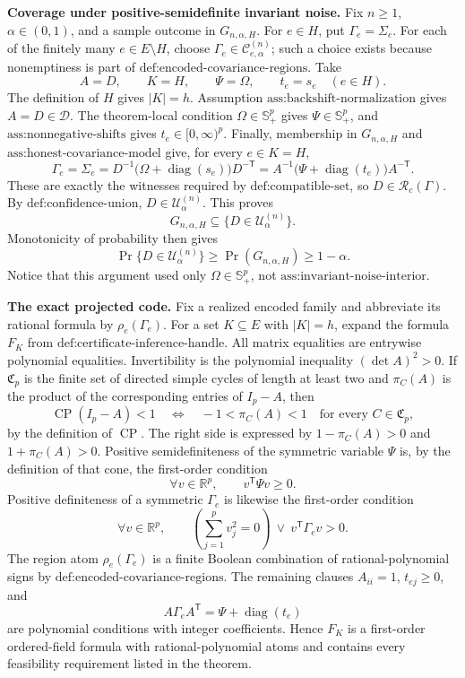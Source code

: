 \textbf{Coverage under positive-semidefinite invariant noise.}
Fix \(n\geq1\), \(\alpha\in(0,1)\), and a sample outcome in \(G_{n,\alpha,H}\). For \(e\in H\), put \(\Gamma_e=\Sigma_e\). For each of the finitely many \(e\in E\setminus H\), choose \(\Gamma_e\in\mathcal C^{(n)}_{e,\alpha}\); such a choice exists because nonemptiness is part of \(\text{def:encoded-covariance-regions}\). Take
\[
A=D,\qquad K=H,\qquad \Psi=\Omega,\qquad t_e=s_e\quad(e\in H).
\]
The definition of \(H\) gives \(|K|=h\). Assumption \(\text{ass:backshift-normalization}\) gives \(A=D\in\mathcal D\). The theorem-local condition \(\Omega\in\mathbb S_+^p\) gives \(\Psi\in\mathbb S_+^p\), and \(\text{ass:nonnegative-shifts}\) gives \(t_e\in[0,\infty)^p\). Finally, membership in \(G_{n,\alpha,H}\) and \(\text{ass:honest-covariance-model}\) give, for every \(e\in K=H\),
\[
\Gamma_e=\Sigma_e
=D^{-1}\bigl(\Omega+\operatorname{diag}(s_e)\bigr)D^{-\mathsf T}
=A^{-1}\bigl(\Psi+\operatorname{diag}(t_e)\bigr)A^{-\mathsf T}.
\]
These are exactly the witnesses required by \(\text{def:compatible-set}\), so \(D\in\mathcal R_c(\Gamma)\). By \(\text{def:confidence-union}\), \(D\in\mathcal U^{(n)}_\alpha\). This proves
\[
G_{n,\alpha,H}\subseteq\{D\in\mathcal U^{(n)}_\alpha\}.
\]
Monotonicity of probability then gives
\[
\Pr\{D\in\mathcal U^{(n)}_\alpha\}
\geq\Pr(G_{n,\alpha,H})\geq1-\alpha.
\]
Notice that this argument used only \(\Omega\in\mathbb S_+^p\), not \(\text{ass:invariant-noise-interior}\).

\textbf{The exact projected code.}
Fix a realized encoded family and abbreviate its rational formula by \(\rho_e(\Gamma_e)\). For a set \(K\subseteq E\) with \(|K|=h\), expand the formula \(F_K\) from \(\text{def:certificate-inference-handle}\). All matrix equalities are entrywise polynomial equalities. Invertibility is the polynomial inequality \((\det A)^2>0\). If \(\mathfrak C_p\) is the finite set of directed simple cycles of length at least two and \(\pi_C(A)\) is the product of the corresponding entries of \(I_p-A\), then
\[
\operatorname{CP}(I_p-A)<1
\quad\Longleftrightarrow\quad
-1<\pi_C(A)<1\quad\text{for every }C\in\mathfrak C_p,
\]
by the definition of \(\operatorname{CP}\). The right side is expressed by \(1-\pi_C(A)>0\) and \(1+\pi_C(A)>0\). Positive semidefiniteness of the symmetric variable \(\Psi\) is, by the definition of that cone, the first-order condition
\[
\forall v\in\mathbb R^p,\qquad v^{\mathsf T}\Psi v\geq0.
\]
Positive definiteness of a symmetric \(\Gamma_e\) is likewise the first-order condition
\[
\forall v\in\mathbb R^p,\qquad
\left(\sum_{j=1}^p v_j^2=0\right)
\ \vee\ v^{\mathsf T}\Gamma_ev>0.
\]
The region atom \(\rho_e(\Gamma_e)\) is a finite Boolean combination of rational-polynomial signs by \(\text{def:encoded-covariance-regions}\). The remaining clauses \(A_{ii}=1\), \(t_{ej}\geq0\), and
\[
A\Gamma_eA^{\mathsf T}=\Psi+\operatorname{diag}(t_e)
\]
are polynomial conditions with integer coefficients. Hence \(F_K\) is a first-order ordered-field formula with rational-polynomial atoms and contains every feasibility requirement listed in the theorem.

